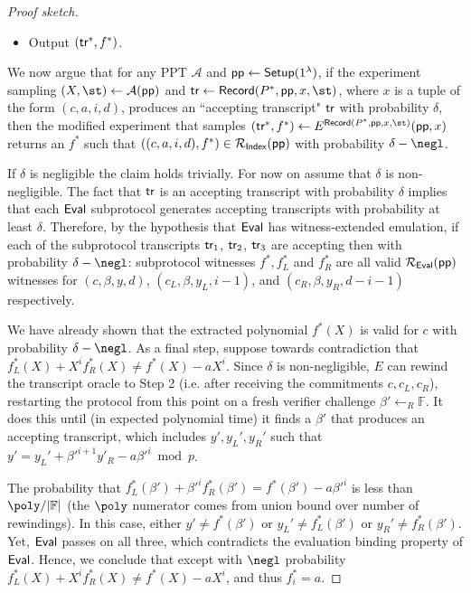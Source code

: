 \documentclass{article}
\theoremstyle{definition}
\begin{document}
\begin{proof}[Proof sketch]
\begin{itemize}
\item Output $(\textsf{{tr}}^*, f^*)$.  
\end{itemize}

We now argue that for any PPT $\mathcal{A}$ and $\textsf{pp} \leftarrow \textsf{{Setup}}(1^\lambda)$, if the experiment sampling $(X, \st) \leftarrow \mathcal{A}(\params)$ and $\tr \leftarrow \pro{Record}(P^*, \params, x, \st)$, where $x$ is a tuple of the form $(c, a, i, d)$, produces an ``accepting transcript" $\textsf{{tr}}$ with probability $\delta$, then the modified experiment that samples $(\tr^*, f^*) \leftarrow E^{\textsf{Record}(P^*, \params, x, \st)}(\params, x)$ returns an $f^*$ such that $((c, a, i, d), f^*) \in \mathcal{R_\textsf{Index}}(\textsf{pp})$ with probability $\delta - \negl$. 

If $\delta$ is negligible the claim holds trivially. For now on assume that $\delta$ is non-negligible. 
The fact that $\textsf{{tr}}$ is an accepting transcript with probability $\delta$ implies that each $\textsf{{Eval}}$ subprotocol generates accepting transcripts with probability at least $\delta$. Therefore, by the hypothesis that $\textsf{{Eval}}$ has witness-extended emulation, if each of the subprotocol transcripts $\textsf{{tr}}_1$, $\textsf{{tr}}_2$, $\textsf{{tr}}_3$ are accepting then with probability $\delta - \negl$: subprotocol witnesses $f^*, f_L^*$ and $f_R^*$ are all valid $\mathcal{R_\textsf{Eval}}(\textsf{pp})$ witnesses for $(c, \beta, y, d)$, $(c_L, \beta, y_L, i-1)$, and $(c_R, \beta, y_R, d - i - 1)$ respectively. 

We have already shown that the extracted polynomial $f^*(X)$ is valid for $c$ with probability $\delta - \negl$. As a final step, suppose towards contradiction that $f_L^*(X) + X^i f_R^*(X) \neq f^*(X) - a X^i$. Since $\delta$ is non-negligible, $E$ can rewind the transcript oracle to Step 2 (i.e. after receiving the commitments $c, c_L, c_R$), restarting the protocol from this point on a fresh verifier challenge $\beta' \leftarrow_R \mathbb{F}$. It does this until (in expected polynomial time) it finds a $\beta'$ that produces an accepting transcript, which includes $y', y_L', y_R'$ such that $y' = y_L' + \beta'^{i+1} y'_R - a \beta'^i \bmod p$.

The probability that $f_L^*(\beta') + \beta'^i f_R^*(\beta') = f^*(\beta') - a \beta'^i$ is less than $\poly / |\mathbb{F}|$ (the $\poly$ numerator comes from union bound over number of rewindings). In this case, either $y' \neq f^*(\beta')$ or $y_L' \neq f^*_L(\beta')$ or $y_R' \neq f^*_R(\beta')$. Yet, $\textsf{{Eval}}$ passes on all three, which contradicts the evaluation binding property of $\textsf{{Eval}}$. Hence, we conclude that except with $\negl$ probability $f_L^*(X) + X^i f_R^*(X) \neq f^*(X) - a X^i$, and thus $f^*_i = a$. 

\end{proof}
\end{document}
